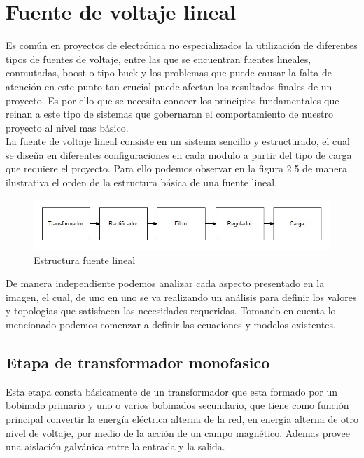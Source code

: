 \newpage
\section{Fuente de voltaje lineal}
Es común en proyectos de electrónica no especializados la utilización de diferentes tipos de fuentes de voltaje, entre las que se encuentran fuentes lineales, conmutadas, boost o tipo buck y los problemas que puede causar la falta de atención en este punto tan crucial puede afectan los resultados finales de un proyecto. Es por ello que se necesita conocer los principios fundamentales que reinan a este tipo de sistemas que gobernaran el comportamiento de nuestro proyecto al nivel mas básico.\\

La fuente de voltaje lineal consiste en un sistema sencillo y estructurado, el cual se diseña en diferentes configuraciones en cada modulo a partir del tipo de carga que requiere el proyecto. Para ello podemos observar en la figura 2.5 de manera ilustrativa el orden de la estructura básica de una fuente lineal.

\begin{figure}[H]
 \centering
 \includegraphics[width=12cm]{capitulo2/figs/fuentelineal.jpg}
 \caption{Estructura fuente lineal}
 \end{figure}
 
 De manera independiente podemos analizar cada aspecto presentado en la imagen, el cual, de uno en uno se va realizando un análisis para definir los valores y topologias que satisfacen las necesidades requeridas. Tomando en cuenta lo mencionado podemos comenzar a definir las ecuaciones y modelos existentes.

\subsection{Etapa de transformador monofasico}

Esta etapa consta básicamente de un transformador que esta formado por un bobinado primario y uno o varios bobinados secundario, que tiene como función principal
convertir la energía eléctrica alterna de la red, en energía alterna de otro nivel de voltaje, por medio de la acción de un campo magnético. Ademas provee una aislación galvánica entre la entrada y la salida.\\

